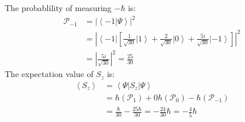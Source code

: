 \documentclass[a4paper,12pt]{article}
\begin{document}
The probablility of measuring $-\hbar$ is:
\begin{align*}
\mathcal{P}_{-1}&=\left|\left<-1\right.\left|\Psi\right>\right|^2\\
&=\left|\left<-1\right|\left[\frac{1}{\sqrt{30}}\left|1\right>+\frac{2}{\sqrt{3  0}}\left|0\right>+\frac{5i}{\sqrt{30}}\left|-1\right>\right]\right|^2\\
&=\left|\frac{5i}{\sqrt{30}}\right|^2=\frac{25}{30}
\end{align*}
The expectation value of $S_z$ is:
\begin{align*}
\left<S_z\right>&=\left<\Psi\right.\left|S_z\right|\left.\Psi\right>\\
&=\hbar(\mathcal{P}_1)+0\hbar(\mathcal{P}_0)-\hbar(\mathcal{P}_{-1})\\
&=\frac{\hbar}{30}-\frac{25\hbar}{30}=-\frac{24}{30}\hbar=-\frac{4}{5}\hbar
\end{align*}
\end{document}
